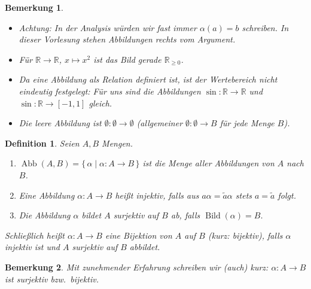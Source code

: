 \documentclass[a4paper]{article}
\theoremstyle{kurzskript}
\newtheorem{definition}[satz]{Definition}
\newtheorem*{bem}{Bemerkung}
\newcommand{\R}{\mathbb{R}}
\begin{document}
\begin{bem}
\leavevmode
\begin{itemize}
  \item Achtung: In der Analysis würden wir fast immer $\alpha(a) = b$ schreiben. In dieser Vorlesung stehen Abbildungen \emph{rechts} vom Argument.
  \item Für $\R \to \R$, $x \mapsto x^2$ ist das Bild gerade $\R_{\geq 0}$.
  \item Da eine Abbildung als Relation definiert ist, ist der Wertebereich nicht eindeutig festgelegt: Für uns sind die Abbildungen $\sin\colon \R \to \R$ und $\sin\colon \R \to [-1, 1]$ gleich.
  \item Die \emph{leere Abbildung} ist $\emptyset\colon \emptyset \to \emptyset$ (allgemeiner $\emptyset\colon \emptyset \to B$ für jede Menge $B$).
\end{itemize}
\end{bem}

\begin{definition}
Seien $A, B$ Mengen.
\begin{enumerate}[label=(\alph*)]
  \item $\operatorname{Abb}(A, B) = \{\, \alpha \mid \alpha\colon A \to B \,\}$ ist die Menge aller Abbildungen von $A$ nach $B$.
  \item Eine Abbildung $\alpha\colon A \to B$ heißt \emph{injektiv}, falls aus $a\alpha = \tilde{a}\alpha$ stets $a = \tilde{a}$ folgt.
  \item Die Abbildung $\alpha$ bildet $A$ \emph{surjektiv} auf $B$ ab, falls $\operatorname{Bild}(\alpha) = B$.
\end{enumerate}
Schließlich heißt $\alpha\colon A \to B$ eine \emph{Bijektion} von $A$ auf $B$ (kurz: \emph{bijektiv}), falls $\alpha$ injektiv ist und $A$ surjektiv auf $B$ abbildet.
\end{definition}

\begin{bem}
Mit zunehmender Erfahrung schreiben wir (auch) kurz: \glqq$\alpha\colon A \to B$ ist surjektiv bzw.\ bijektiv.\grqq
\end{bem}
\end{document}
